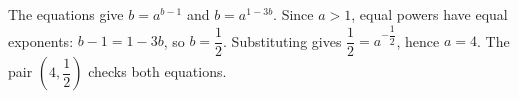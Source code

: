 The equations give $b=a^{b-1}$ and $b=a^{1-3b}$. Since $a>1$, equal powers have equal exponents: $b-1=1-3b$, so $b=\dfrac{1}{2}$. Substituting gives $\dfrac{1}{2}=a^{-\dfrac{1}{2}}$, hence $\boxed{a=4}$. The pair $(4,\dfrac{1}{2})$ checks both equations.
